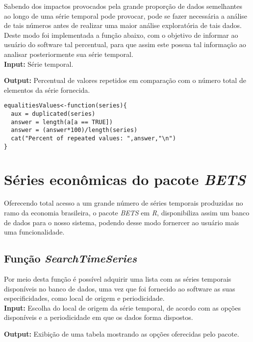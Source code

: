 \documentclass[12pt,letterpaper]{article}
\begin{document}
Sabendo dos impactos provocados pela grande proporção de dados semelhantes ao longo de uma série temporal pode provocar, pode se fazer necessária a análise de tais números antes de realizar uma maior análise exploratória de tais dados.\\ 

Deste modo foi implementada a função abaixo, com o objetivo de informar ao usuário do software tal percentual, para que assim este possua tal informação ao analisar posteriormente sua série temporal.\\

\textbf{Input: } Série temporal.

\textbf{Output: } Percentual de valores repetidos em comparação com o número total de elementos da série fornecida.\\

\begin{lstlisting}
equalitiesValues<-function(series){
  aux = duplicated(series)
  answer = length(a[a == TRUE])
  answer = (answer*100)/length(series)
  cat("Percent of repeated values: ",answer,"\n")
}
\end{lstlisting}

\section{Séries econômicas do pacote \textit{BETS}}

Oferecendo total acesso a um grande número de séries temporais produzidas no ramo da economia brasileira, o pacote \textit{BETS} em \textit{R}, disponibiliza assim  um banco de dados para o nosso sistema, podendo desse modo fornercer ao usuário mais uma funcionalidade.\\

\subsection{Função \textit{SearchTimeSeries}}

Por meio desta  função é possível adquirir uma lista com as séries temporais disponíveis no banco de dados, uma vez que foi fornecido ao software as suas especificidades, como local de origem e periodicidade.\\

\textbf{Input: } Escolha do local de origem da série temporal, de acordo com as opções disponíveis e a periodicidade em que os dados forma dispostos.

\textbf{Output: } Exibição de uma tabela mostrando as opções oferecidas pelo pacote.\\ 
\end{document}
